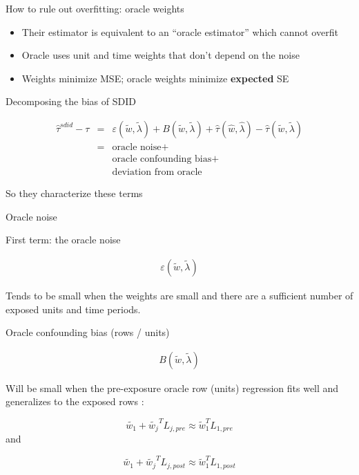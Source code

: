 \documentclass{beamer}
\begin{document}
\begin{frame}{How to rule out overfitting: oracle weights}

\begin{itemize}
\item Their estimator is equivalent to an ``oracle estimator'' which cannot overfit
\item Oracle uses unit and time weights that don't depend on the noise
\item Weights minimize MSE; oracle weights minimize \textbf{expected} SE
\end{itemize}

\end{frame}

\begin{frame}{Decomposing the bias of SDID}

\begin{eqnarray*}
\widehat{\tau}^{sdid} - \tau  &=& \varepsilon(\widetilde{w}, \widetilde{\lambda}) + B(\widetilde{w}, \widetilde{\lambda}) + \widehat{\tau}(\widehat{w},\widehat{\lambda}) - \widehat{\tau}(\widetilde{w},\widetilde{\lambda}) \\
&=& \textrm{oracle noise} +  \\
&& \textrm{oracle confounding bias} + \\
&&\textrm{deviation from oracle}
\end{eqnarray*}

\bigskip

So they characterize these terms

\end{frame}


\begin{frame}{Oracle noise}

First term: the oracle noise

\bigskip

\begin{eqnarray*}
\varepsilon(\widetilde{w}, \widetilde{\lambda})
\end{eqnarray*}

\bigskip

Tends to be small when the weights are small and there are a sufficient number of exposed units and time periods. 

\end{frame}

\begin{frame}{Oracle confounding bias (rows / units)}

\begin{eqnarray*}
B(\widetilde{w}, \widetilde{\lambda}) 
\end{eqnarray*}

\bigskip

Will be small when the pre-exposure oracle row (units) regression fits well and generalizes to the exposed rows :
 
 $$\widetilde{w_1} + \widetilde{w_{j}}^TL_{j,pre} \approx \widetilde{w}_1^TL_{1,pre}$$and
 
 $$\widetilde{w_1} + \widetilde{w_{j}}^TL_{j,post} \approx \widetilde{w}_1^TL_{1,post}$$
 
 \end{frame}
 
\end{document}
